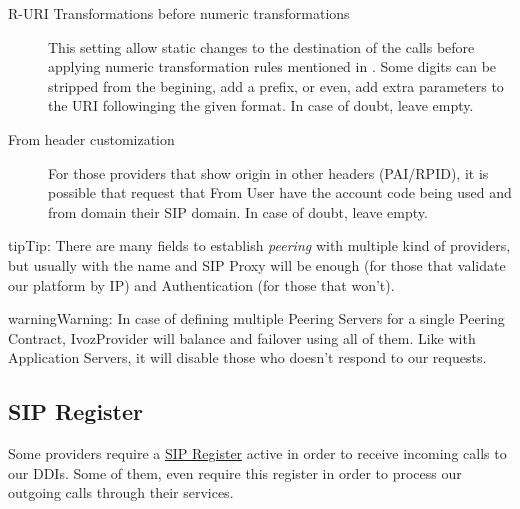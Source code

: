 \documentclass[letterpaper,10pt,english]{sphinxmanual}
\begin{document}
\begin{description}
\item[{R-URI Transformations before numeric transformations}] \leavevmode{}\label{brand/peering/peer_servers:term-r-uri-transformations-before-numeric-transformations}
This setting allow static changes to the destination of the calls before
applying numeric transformation rules mentioned in
{\hyperref[brand/transformations/index:numeric\string-transformations]{}}. Some digits can be stripped from the
begining, add a prefix, or even, add extra parameters to the URI
followinging the given format. In case of doubt, leave empty.

\item[{From header customization}] \leavevmode{}\label{brand/peering/peer_servers:term-from-header-customization}
For those providers that show origin in other headers (PAI/RPID), it is
possible that request that From User have the account code being used
and from domain their SIP domain. In case of doubt, leave empty.

\end{description}

\begin{notice}{tip}{Tip:}
There are many fields to establish \emph{peering} with multiple kind of
providers, but usually with the name and SIP Proxy will be enough (for
those that validate our platform by IP) and Authentication (for those that
won't).
\end{notice}

\begin{notice}{warning}{Warning:}
In case of defining multiple Peering Servers for a single
Peering Contract, IvozProvider will balance and failover using all of them.
Like with Application Servers, it will disable those who doesn't respond to
our requests.
\end{notice}


\subsection{SIP Register}
\label{brand/peering/sip_register:sip-register}\label{brand/peering/sip_register::doc}
Some providers require a \href{https://tools.ietf.org/html/rfc3261\#section-10}{SIP Register} active in order to receive
incoming calls to our DDIs. Some of them, even require this register in order
to process our outgoing calls through their services.
\end{document}
